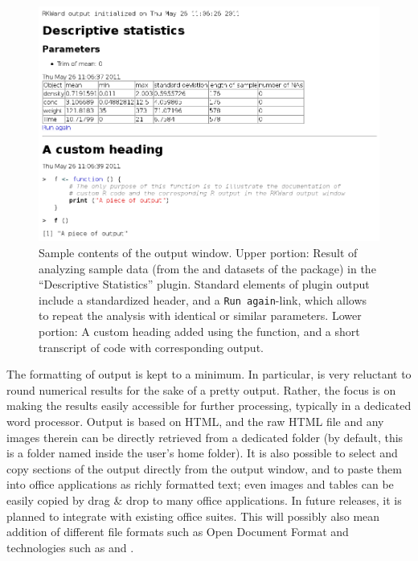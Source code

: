 \begin{figure}[t!]
 \centering
 \includegraphics[width=15.5cm]{./figures/results_output_cropped.png}
 \caption{Sample contents of the output window. Upper portion: Result of analyzing sample data (from the
 and 
  datasets of the  package) in the ``Descriptive Statistics'' plugin. Standard elements of
  plugin output include a standardized header, and a  \texttt{Run again}-link, which allows to repeat the
  analysis with identical or similar parameters. Lower portion: A custom heading added using the
   function, and a short transcript of  code with corresponding output.}
 \label{fig:results_output}
\end{figure}

The formatting of output is kept to a minimum. In particular,
 is very reluctant to round numerical results for the sake of a
pretty output. Rather, the focus is on making the results easily
accessible for further processing, typically in a dedicated word
processor. Output is based on
HTML, and the raw
HTML file and any images therein can be directly
retrieved from a dedicated folder
(by default, this is a folder named  inside the user's home folder). It is also
possible to select and copy sections of the output directly from the
output window, and to paste them into office applications as
richly formatted text; even images and tables can be easily copied by drag \& drop to many office applications. In future releases, 
it is planned to integrate 
with existing office suites. This
will possibly also mean addition of different file formats such as Open Document Format and technologies such as  and 
\citep{Leisch2002, Kuhn2006}.

